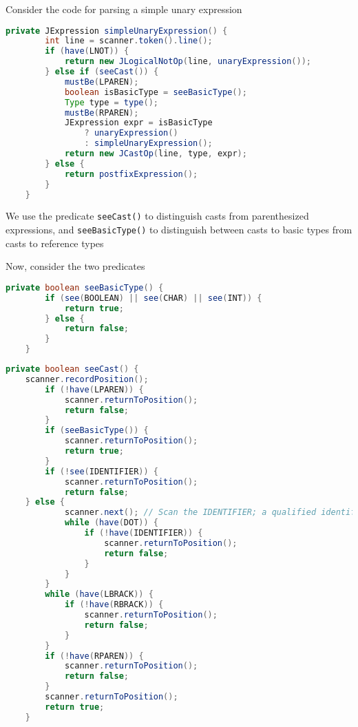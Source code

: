 \documentclass[8pt,a4paper,compress,handout]{beamer}
\begin{document}
\begin{frame}[fragile]
\pause

Consider the code for parsing a simple unary expression

\begin{lstlisting}[language=Java]
    private JExpression simpleUnaryExpression() {
        int line = scanner.token().line();
        if (have(LNOT)) {
            return new JLogicalNotOp(line, unaryExpression());
        } else if (seeCast()) {
            mustBe(LPAREN);
            boolean isBasicType = seeBasicType();
            Type type = type();
            mustBe(RPAREN);
            JExpression expr = isBasicType
                ? unaryExpression()
                : simpleUnaryExpression();
            return new JCastOp(line, type, expr);
        } else {
            return postfixExpression();
        }
    }
\end{lstlisting}

\pause
\bigskip

We use the predicate \lstinline{seeCast()} to distinguish casts from parenthesized expressions, and \lstinline{seeBasicType()} to distinguish between casts to basic types from casts to reference types

\pause
\bigskip

Now, consider the two predicates

\begin{lstlisting}[language=Java]
    private boolean seeBasicType() {
        if (see(BOOLEAN) || see(CHAR) || see(INT)) {
            return true;
        } else {
            return false;
        }
    }
\end{lstlisting}
\end{frame}

\begin{frame}[fragile]
\pause

\begin{lstlisting}[language=Java]
    private boolean seeCast() {
	scanner.recordPosition();
        if (!have(LPAREN)) {
            scanner.returnToPosition();
            return false;
        }
        if (seeBasicType()) {
            scanner.returnToPosition();
            return true;
        }
        if (!see(IDENTIFIER)) {
            scanner.returnToPosition();
            return false;
	} else {
            scanner.next(); // Scan the IDENTIFIER; a qualified identifier is ok
            while (have(DOT)) {
                if (!have(IDENTIFIER)) {
                    scanner.returnToPosition();
                    return false;
                }
            }
        }
        while (have(LBRACK)) {
            if (!have(RBRACK)) {
                scanner.returnToPosition();
                return false;
            }
        }
        if (!have(RPAREN)) {
            scanner.returnToPosition();
            return false;
        }
        scanner.returnToPosition();
        return true;
    }
\end{lstlisting}
\end{frame}
\end{document}
